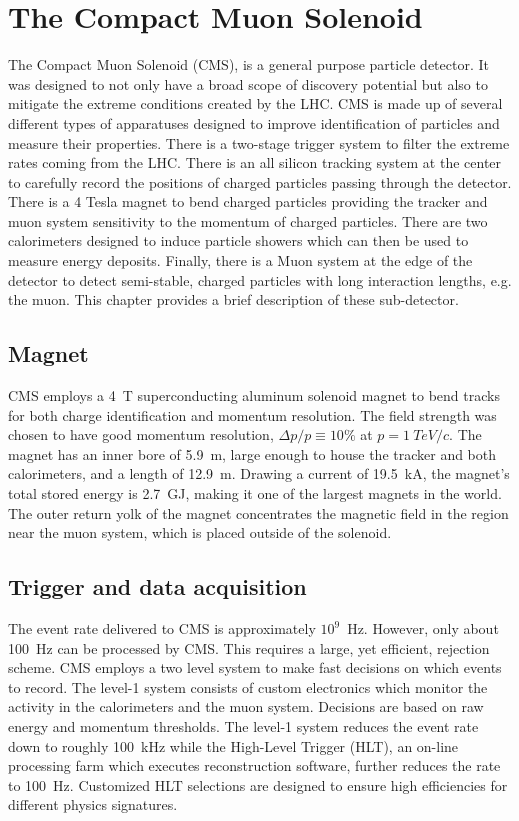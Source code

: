 \section{The Compact Muon Solenoid}
\label{sec:CMS}

The Compact Muon Solenoid (CMS), is a general purpose particle
detector.  It was designed to not only have a broad scope of
discovery potential but also to mitigate the extreme conditions
created by the LHC.  CMS is made up of several different types of
apparatuses designed to improve identification of particles and
measure their properties.  There is a two-stage trigger system
to filter the extreme rates coming from the LHC.  There is an all
silicon tracking system at the center to carefully record the 
positions of charged particles passing through the detector.  
There is a 4 Tesla magnet to bend charged particles providing the
tracker and muon system sensitivity to the momentum of charged 
particles.  There are two calorimeters designed to induce particle
showers which can then be used to measure energy deposits.  
Finally, there is a Muon system at the edge of the detector to
detect semi-stable, charged particles with long interaction
lengths, e.g. the muon. This chapter provides a brief description
of these sub-detector.  

\subsection{Magnet}
\label{sec:Magnet}

CMS employs a 4~T superconducting aluminum solenoid magnet to bend
tracks for both charge identification and momentum resolution.  
The field strength was chosen to have good momentum resolution, 
$\Delta p/p\equiv10\%$ at $p=1~TeV/c$.  The magnet has an inner 
bore of 5.9~m, large enough to house the tracker and both 
calorimeters, and a length of 12.9~m.  Drawing a current of 
19.5~kA, the magnet's total stored energy is 2.7~GJ, making it
one of the largest magnets in the world.  The outer return yolk 
of the magnet concentrates the magnetic field in the
region near the muon system, which is placed outside of the 
solenoid.  


\subsection{Trigger and data acquisition}

The event rate delivered to CMS is approximately $10^9$~Hz.  
However, only about 100~Hz can be processed by CMS.  
This requires a large, yet efficient, rejection scheme.  
CMS employs a two level system to make fast decisions on 
which events to record.  The level-1 system consists of 
custom electronics which monitor the activity in the calorimeters
and the muon system.   Decisions are based on raw energy
and momentum thresholds.  The level-1 system reduces the
event rate down to roughly 100~kHz while the High-Level 
Trigger (HLT), an on-line
processing farm which executes reconstruction software, 
further reduces the rate to 100~Hz.  Customized HLT selections
are designed to ensure high efficiencies for different 
physics signatures.  

